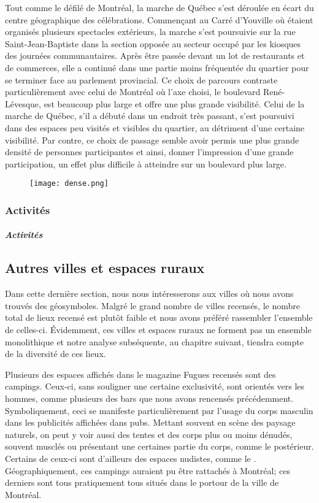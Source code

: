 Tout comme le défilé de Montréal, la marche de Québec s'est déroulée en écart du centre géographique des célébrations.
Commençant au Carré d'Youville où étaient organisés plusieurs spectacles extérieurs, la marche s'est poursuivie sur la rue Saint-Jean-Baptiste dans la section opposée au secteur occupé par les kiosques des journées communautaires.
Après être passée devant un lot de restaurants et de commerces, elle a continué dans une partie moins fréquentée du quartier pour se terminer face au parlement provincial.
Ce choix de parcours contraste particulièrement avec celui de Montréal où l'axe choisi, le boulevard René-Lévesque, est beaucoup plus large et offre une plus grande visibilité.
Celui de la marche de Québec, s'il a débuté dans un endroit très passant, s'est poursuivi dans des espaces peu visités et visibles du quartier, au détriment d'une certaine visibilité.
Par contre, ce choix de passage semble avoir permis une plus grande densité de personnes participantes et ainsi, donner l'impression d'une grande participation, un effet plus difficile à atteindre sur un boulevard plus large.

\begin{figure}[ht]
\centering
\texttt{[image: dense.png]}\caption{\label{fig:label} }
\end{figure}

\subsubsection{Activités}
\subparagraph{Activités}
\label{subsec:activitesfiertemontreal}

\subsection{Autres villes et espaces ruraux}
\label{subsec:autresvilles}

Dans cette dernière section, nous nous intéresserons aux villes où nous avons trouvés des géosymboles.
Malgré le grand nombre de villes recensés, le nombre total de lieux \lgbt{} recensé est plutôt faible et nous avons préféré rassembler l'ensemble de celles-ci.
Évidemment, ces villes et espaces ruraux ne forment pas un ensemble monolithique et notre analyse subséquente, au chapitre suivant, tiendra compte de la diversité de ces lieux.

Plusieurs des espaces affichés dans le magazine Fugues recensés sont des campings.
Ceux-ci, sans souligner une certaine exclusivité, sont orientés vers les hommes, comme plusieurs des bars que nous avons rencensés précédemment.
Symboliquement, ceci se manifeste particulièrement par l'usage du corps masculin dans les publicités affichées dans pubs.
Mettant souvent en scène des paysage naturels, on peut y voir aussi des tentes et des corps plus ou moins dénudés, souvent musclés ou présentant une certaines partie du corps, comme le postérieur.
Certains de ceux-ci sont d'ailleurs des espaces nudistes, comme le .
Géographiquement, ces campings auraient pu être rattachés à Montréal; ces derniers sont tous pratiquement tous situés dans le portour de la ville de Montréal.

